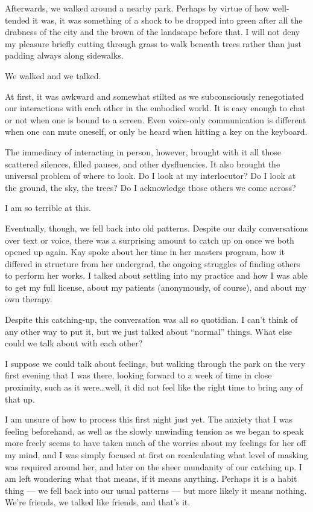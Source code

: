 Afterwards, we walked around a nearby park. Perhaps by virtue of how well-tended it was, it was something of a shock to be dropped into green after all the drabness of the city and the brown of the landscape before that. I will not deny my pleasure briefly cutting through grass to walk beneath trees rather than just padding always along sidewalks.

We walked and we talked.

At first, it was awkward and somewhat stilted as we subconsciously renegotiated our interactions with each other in the embodied world. It is easy enough to chat or not when one is bound to a screen. Even voice-only communication is different when one can mute oneself, or only be heard when hitting a key on the keyboard.

The immediacy of interacting in person, however, brought with it all those scattered silences, filled pauses, and other dysfluencies. It also brought the universal problem of where to look. Do I look at my interlocutor? Do I look at the ground, the sky, the trees? Do I acknowledge those others we come across?

I am so terrible at this.

Eventually, though, we fell back into old patterns. Despite our daily conversations over text or voice, there was a surprising amount to catch up on once we both opened up again. Kay spoke about her time in her masters program, how it differed in structure from her undergrad, the ongoing struggles of finding others to perform her works. I talked about settling into my practice and how I was able to get my full license, about my patients (anonymously, of course), and about my own therapy.

Despite this catching-up, the conversation was all so quotidian. I can't think of any other way to put it, but we just talked about ``normal'' things. What else could we talk about with each other?

I suppose we could talk about feelings, but walking through the park on the very first evening that I was there, looking forward to a week of time in close proximity, such as it were\ldots well, it did not feel like the right time to bring any of that up.

I am unsure of how to process this first night just yet. The anxiety that I was feeling beforehand, as well as the slowly unwinding tension as we began to speak more freely seems to have taken much of the worries about my feelings for her off my mind, and I was simply focused at first on recalculating what level of masking was required around her, and later on the sheer mundanity of our catching up. I am left wondering what that means, if it means anything. Perhaps it is a habit thing --- we fell back into our usual patterns --- but more likely it means nothing. We're friends, we talked like friends, and that's it.

